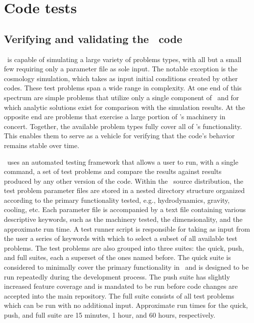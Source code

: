 
\section{Code tests}
\label{sec.tests}

\subsection{Verifying and validating the \enzo\ code}
\label{sec.tests.vandv}

\enzo\ is capable of simulating a large variety of problems types, with
all but a small few requiring only a parameter file as sole input.
The notable exception is the cosmology simulation, which takes as
input initial conditions created by other codes.  These test problems
span a wide range in complexity.  At one end of this spectrum are
simple problems that utilize only a single component of \enzo\ and for
which analytic solutions exist for comparison with the simulation
results.  At the opposite end are problems that exercise a large
portion of \enzo's machinery in concert.  Together, the available
problem types fully cover all of \enzo's functionality.  This enables
them to serve as a vehicle for verifying that the code's behavior
remains stable over time.

\enzo\ uses an automated testing framework that allows a user to run,
with a single command, a set of test problems and compare the results
against results produced by any other version of the code.  Within the
\enzo\ source distribution, the test problem parameter files are stored
in a nested directory structure organized according to the primary
functionality tested, e.g., hydrodynamics, gravity, cooling, etc.
Each parameter file is accompanied by a text file containing various
descriptive keywords, such as the machinery tested, the
dimensionality, and the approximate run time.  A test runner script is
responsible for taking as input from the user a series of keywords
with which to select a subset of all available test problems.  The
test problems are also grouped into three suites: the quick, push, and
full suites, each a superset of the ones named before.  The quick
suite is considered to minimally cover the primary functionality in
\enzo\ and is designed to be run repeatedly during the development
process.  The push suite has slightly increased feature coverage and
is mandated to be run before code changes are accepted into the main
repository.  The full suite consists of all test problems which can be
run with no additional input.  Approximate run times for the quick,
push, and full suite are 15 minutes, 1 hour, and 60 hours,
respectively.

